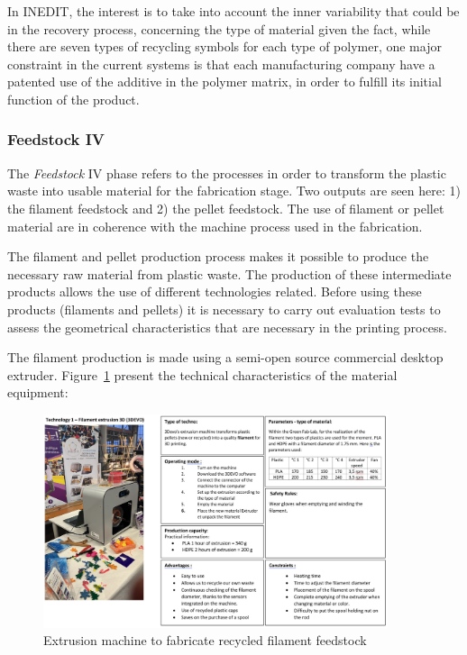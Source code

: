 \documentclass[
  11pt,
]{article}
\begin{document}
In INEDIT, the interest is to take into account the inner variability
that could be in the recovery process, concerning the type of material
given the fact, while there are seven types of recycling symbols for
each type of polymer, one major constraint in the current systems is
that each manufacturing company have a patented use of the additive in
the polymer matrix, in order to fulfill its initial function of the
product.

\hypertarget{feedstock-iv}{%
\subsubsection{Feedstock IV}\label{feedstock-iv}}

The \emph{Feedstock} IV phase refers to the processes in order to
transform the plastic waste into usable material for the fabrication
stage. Two outputs are seen here: 1) the filament feedstock and 2) the
pellet feedstock. The use of filament or pellet material are in
coherence with the machine process used in the fabrication.

The filament and pellet production process makes it possible to produce
the necessary raw material from plastic waste. The production of these
intermediate products allows the use of different technologies related.
Before using these products (filaments and pellets) it is necessary to
carry out evaluation tests to assess the geometrical characteristics
that are necessary in the printing process.

The filament production is made using a semi-open source commercial
desktop extruder. Figure~\ref{fig-feedstock} present the technical
characteristics of the material equipment:

\begin{figure}[H]

{\centering \includegraphics[width=0.9\textwidth,height=\textheight]{figures/feedstock/3devo-00.jpg}

}

\caption{\label{fig-feedstock}Extrusion machine to fabricate recycled
filament feedstock}

\end{figure}
\end{document}
